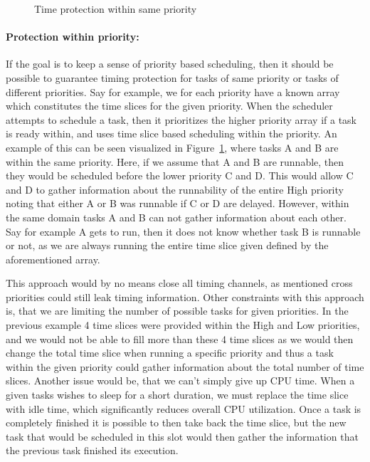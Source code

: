 \begin{figure}
  \begin{center}
    
  \end{center}
  \caption{Time protection within same priority}\label{fig:prio_sched}
\end{figure}

\paragraph{Protection within priority:} If the goal is to keep a sense of
priority based scheduling, then it should be possible to guarantee timing
protection for tasks of same priority or tasks of different priorities. Say for
example, we for each priority have a known array which constitutes the time
slices for the given priority. When the scheduler attempts to schedule a task,
then it prioritizes the higher priority array if a task is ready within, and
uses time slice based scheduling within the priority. An example of this can be
seen visualized in Figure~\ref{fig:prio_sched}, where tasks A and B are within
the same priority. Here, if we assume that A and B are runnable, then they
would be scheduled before the lower priority C and D. This would allow C and D
to gather information about the runnability of the entire High priority noting
that either A or B was runnable if C or D are delayed. However, within the same
domain tasks A and B can not gather information about each other. Say for
example A gets to run, then it does not know whether task B is runnable or not,
as we are always running the entire time slice given defined by the
aforementioned array.

This approach would by no means close all timing channels, as mentioned cross
priorities could still leak timing information. Other constraints with this
approach is, that we are limiting the number of possible tasks for given
priorities. In the previous example 4 time slices were provided within the High
and Low priorities, and we would not be able to fill more than these 4 time
slices as we would then change the total time slice when running a specific
priority and thus a task within the given priority could gather information
about the total number of time slices. Another issue would be, that we can't
simply give up CPU time. When a given tasks wishes to sleep for a short
duration, we must replace the time slice with idle time, which significantly
reduces overall CPU utilization. Once a task is completely finished it is
possible to then take back the time slice, but the new task that would be
scheduled in this slot would then gather the information that the previous task
finished its execution. 

